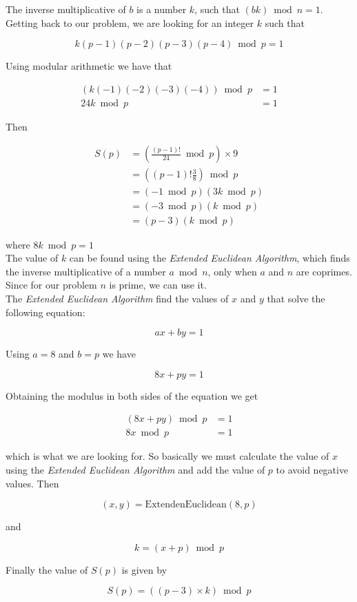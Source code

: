 The inverse multiplicative of $b$ is a number $k$, such that $(bk) \bmod n = 1$. Getting back to our problem, we are looking for an integer $k$ such that

$$
k(p-1)(p-2)(p-3)(p-4) \bmod p = 1
$$

Using modular arithmetic we have that

\begin{align*}
    (k(-1)(-2)(-3)(-4)) \bmod p &= 1 \\
    24k \bmod p &= 1
\end{align*}

Then 

\begin{align*}
    S(p) &= \left ( \frac{(p-1)!}{24} \bmod{p} \right ) \times 9 \\
    &= \left ( (p-1)! \frac{3}{8} \right ) \bmod p \\
    &= (-1 \bmod p) (3k \bmod p) \\
    &= (-3 \bmod p) (k \bmod p)\\
    &= (p-3)(k \bmod p)
\end{align*}

where $8k \bmod p = 1$\\

The value of $k$ can be found using the \textit{Extended Euclidean Algorithm}, which finds the inverse multiplicative of a number $a \bmod n$, only when $a$ and $n$ are coprimes. Since for our problem $n$ is prime, we can use it.\\

The \textit{Extended Euclidean Algorithm} find the values of $x$ and $y$ that solve the following equation:

$$
ax + by = 1
$$

Using $a=8$ and $b=p$ we have

$$
8x + py = 1
$$

Obtaining the modulus in both sides of the equation we get

\begin{align*}
    (8x + py) \bmod p &= 1 \\
    8x \bmod p &= 1
\end{align*}

which is what we are looking for. So basically we must calculate the value of $x$ using the \textit{Extended Euclidean Algorithm} and add the value of $p$ to avoid negative values. Then

$$
(x,y) = \mbox{ExtendenEuclidean}(8,p)
$$

and

$$
k = \left (x + p \right ) \bmod p
$$

Finally the value of $S(p)$ is given by

$$
S(p) = \left ( (p-3) \times k \right ) \bmod p
$$